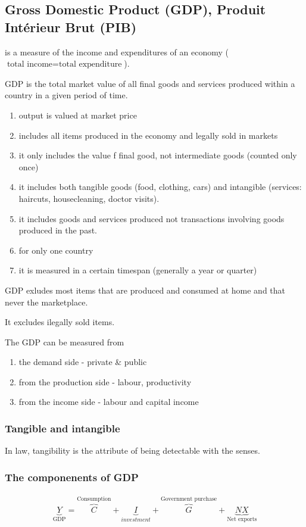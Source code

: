 \documentclass[a4paper,titlepage] {scrartcl}
\begin{document}
\subsection{Gross Domestic Product (GDP), Produit Intérieur Brut (PIB)}
is a measure of the income and expenditures of an economy ($\text{total income}=\text{total expenditure}$).

GDP is the total market value of all final goods and services produced within a country in a given period of time.

\begin{enumerate}
	\item output is valued at market price
	\item includes all items produced in the economy and legally sold in markets
	\item it only includes the value f final good, not intermediate goods (counted only once)
	\item it includes both tangible goods (food, clothing, cars) and intangible (services: haircuts, housecleaning, doctor visits). 
	\item it includes goods and services produced not transactions involving goods produced in the past.
	\item for only one country
	\item it is measured in a certain timespan (generally a year or quarter)
\end{enumerate}

GDP exludes most items that are produced and consumed at home and that never the marketplace.

It excludes ilegally sold items.

The GDP can be measured from 
\begin{enumerate}
	\item the demand side - private \& public
	\item from the production side - labour, productivity
	\item from the income side - labour and capital income
\end{enumerate}

\subsubsection{Tangible and intangible}
In law, tangibility is the attribute of being detectable with the senses.


\subsubsection{The componenents of GDP}
\begin{eqnarray*}
	\underbrace{Y}_{\text{GDP}}=
	 \overbrace{C}^{\text{Consumption}}
	+\underbrace{I}_{investment}
	+\overbrace{G}^{\text{Government purchase}}
	+\underbrace{NX}_{\text{Net exports}}
\end{eqnarray*}
\end{document}

